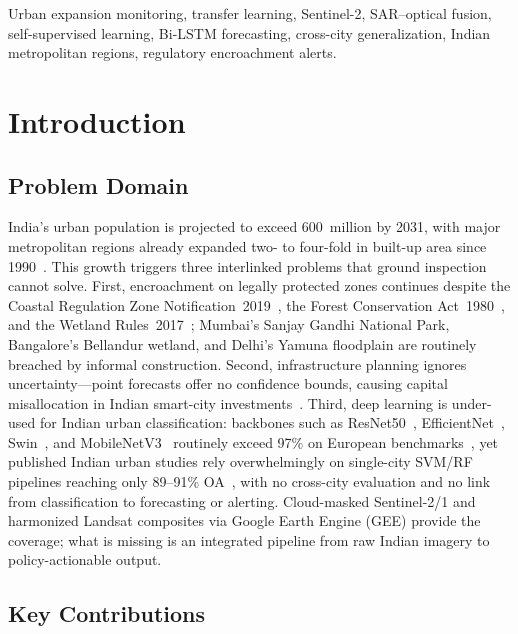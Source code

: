 \documentclass[conference]{IEEEtran}
\begin{document}
\begin{IEEEkeywords}
Urban expansion monitoring, transfer learning, Sentinel-2, SAR--optical fusion, self-supervised learning, Bi-LSTM forecasting, cross-city generalization, Indian metropolitan regions, regulatory encroachment alerts.
\end{IEEEkeywords}

\section{Introduction}

\subsection{Problem Domain}

India's urban population is projected to exceed 600~million by 2031, with major metropolitan regions already expanded two- to four-fold in built-up area since 1990~\cite{census2011}. This growth triggers three interlinked problems that ground inspection cannot solve. First, encroachment on legally protected zones continues despite the Coastal Regulation Zone Notification~2019~\cite{crz2019}, the Forest Conservation Act~1980~\cite{fca1980}, and the Wetland Rules~2017~\cite{wetland2017}; Mumbai's Sanjay Gandhi National Park, Bangalore's Bellandur wetland, and Delhi's Yamuna floodplain are routinely breached by informal construction. Second, infrastructure planning ignores uncertainty---point forecasts offer no confidence bounds, causing capital misallocation in Indian smart-city investments~\cite{smartcity}. Third, deep learning is under-used for Indian urban classification: backbones such as ResNet50~\cite{he2016}, EfficientNet~\cite{tan2019}, Swin~\cite{liu2021}, and MobileNetV3~\cite{howard2019} routinely exceed 97\% on European benchmarks~\cite{helber2019}, yet published Indian urban studies rely overwhelmingly on single-city SVM/RF pipelines reaching only 89--91\% OA~\cite{chamoli2024}, with no cross-city evaluation and no link from classification to forecasting or alerting. Cloud-masked Sentinel-2/1 and harmonized Landsat composites via Google Earth Engine (GEE) provide the coverage; what is missing is an integrated pipeline from raw Indian imagery to policy-actionable output.

\subsection{Key Contributions}
\end{document}
